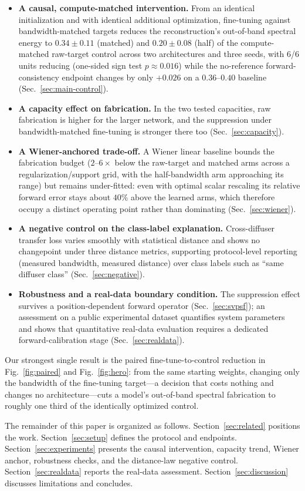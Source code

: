 \begin{itemize}
\item \textbf{A causal, compute-matched intervention.} From an identical initialization and with identical additional optimization, fine-tuning against bandwidth-matched targets reduces the reconstruction's out-of-band spectral energy to $0.34\pm0.11$ (matched) and $0.20\pm0.08$ (half) of the compute-matched raw-target control across two architectures and three seeds, with 6/6 units reducing (one-sided sign test $p\approx0.016$) while the no-reference forward-consistency endpoint changes by only $+0.026$ on a $0.36$--$0.40$ baseline (Sec.~\ref{sec:main-control}).
\item \textbf{A capacity effect on fabrication.} In the two tested capacities, raw fabrication is higher for the larger network, and the suppression under bandwidth-matched fine-tuning is stronger there too (Sec.~\ref{sec:capacity}).
\item \textbf{A Wiener-anchored trade-off.} A Wiener linear baseline bounds the fabrication budget ($2$--$6\times$ below the raw-target and matched arms across a regularization/support grid, with the half-bandwidth arm approaching its range) but remains under-fitted: even with optimal scalar rescaling its relative forward error stays about $40\%$ above the learned arms, which therefore occupy a distinct operating point rather than dominating (Sec.~\ref{sec:wiener}).
\item \textbf{A negative control on the class-label explanation.} Cross-diffuser transfer loss varies smoothly with statistical distance and shows no changepoint under three distance metrics, supporting protocol-level reporting (measured bandwidth, measured distance) over class labels such as ``same diffuser class'' (Sec.~\ref{sec:negative}).
\item \textbf{Robustness and a real-data boundary condition.} The suppression effect survives a position-dependent forward operator (Sec.~\ref{sec:svpsf}); an assessment on a public experimental dataset quantifies system parameters and shows that quantitative real-data evaluation requires a dedicated forward-calibration stage (Sec.~\ref{sec:realdata}).
\end{itemize}

Our strongest single result is the paired fine-tune-to-control reduction in Fig.~\ref{fig:paired} and Fig.~\ref{fig:hero}: from the same starting weights, changing only the bandwidth of the fine-tuning target---a decision that costs nothing and changes no architecture---cuts a model's out-of-band spectral fabrication to roughly one third of the identically optimized control.

The remainder of this paper is organized as follows. Section~\ref{sec:related} positions the work. Section~\ref{sec:setup} defines the protocol and endpoints. Section~\ref{sec:experiments} presents the causal intervention, capacity trend, Wiener anchor, robustness checks, and the distance-law negative control. Section~\ref{sec:realdata} reports the real-data assessment. Section~\ref{sec:discussion} discusses limitations and concludes.
